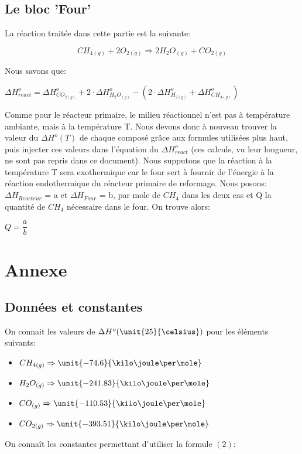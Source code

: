 \documentclass[11pt,a4paper]{report}
\begin{document}
\subsection*{Le bloc 'Four'}
La réaction traitée dans cette partie est la suivante:

$$CH_{4(g)} + 2O_{2(g)} \Rightarrow 2H_{2}O_{(g)} + CO_{2(g)}$$

Nous savons que:

$\Delta H^o_{react} = \Delta H^o_{CO_{2(g)}} + 2\cdot \Delta H^o_{H_{2}O_{(g)}} - (2\cdot \Delta H^o_{H_{2(g)}} + \Delta H^o_{CH_{4(g)}}) $

Comme pour le réacteur primaire, le milieu réactionnel n'est pas à température ambiante, mais à la température T. 
Nous devons donc à nouveau trouver la valeur du $\Delta H^o(T)$ de chaque composé grâce aux formules utilisées plus haut,
puis injecter ces valeurs dans l'équation du $\Delta H^o_{react}$ (ces calculs, vu leur longueur, ne sont pas repris dans
ce document).
Nous supputons que la réaction à la température T sera exothermique car le four sert à fournir de l'énergie à la réaction
endothermique du réacteur primaire de reformage.
Nous posons:$\Delta H_{Reacteur}$  = a et $\Delta H_{Four}$  = b, par mole de $CH_4$ dans les deux cas et Q  la quantité 
de $CH_4$ nécessaire dans le four.
On trouve alors:

$Q = \dfrac{a}{b}$



\section*{Annexe}
\subsection*{Données et constantes}
On connait les valeurs de $\Delta H^o (\unit{25}{\celsius})$ pour les éléments suivants:
\begin{itemize}
\item{$CH_{4(g)} \Rightarrow \unit{-74.6}{\kilo\joule\per\mole}$}
\item{$H_2O_{(g)} \Rightarrow \unit{-241.83}{\kilo\joule\per\mole}$}
\item{$CO_{(g)} \Rightarrow \unit{-110.53}{\kilo\joule\per\mole}$}
\item{$CO_{2(g)} \Rightarrow \unit{-393.51}{\kilo\joule\per\mole}$}
\end{itemize}

On connaît les constantes permettant d'utiliser la formule $(2)$:
\end{document}
